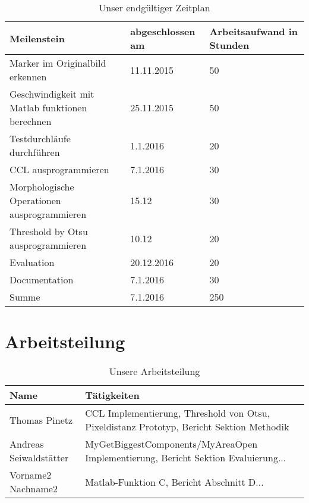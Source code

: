 \documentclass[deutsch]{scrartcl}
\begin{document}
\begin{center}
	\begin{table}
		\begin{tabularx}{\textwidth}{ |X|X|X| }
			\hline
			Meilenstein & abgeschlossen am & Arbeitsaufwand in Stunden\\
			\hline		
			Marker im Originalbild erkennen & 11.11.2015 &	50 \\
			\hline
			Geschwindigkeit mit Matlab funktionen berechnen & 25.11.2015 & 50\\ 
			\hline
			Testdurchläufe durchführen & 1.1.2016 & 20 \\
			\hline
			CCL ausprogrammieren & 7.1.2016 & 30\\
			\hline		
			Morphologische Operationen ausprogrammieren & 15.12 & 30 \\
			\hline
			Threshold by Otsu ausprogrammieren & 10.12 & 20 \\
			\hline
			Evaluation & 20.12.2016 & 20 \\
			\hline
			Documentation & 7.1.2016 & 30 \\
			\hline
			\hline
			Summe & 7.1.2016 & 250 \\
			\hline
		\end{tabularx}	
		\caption{Unser endgültiger Zeitplan}
		\label{table:zeitplan}
	\end{table}
\end{center}


\section{Arbeitsteilung}

\begin{center}
	\begin{table}
	\begin{tabularx} {\textwidth}{ |X | X | }
		\hline
		Name & Tätigkeiten\\
		\hline
		Thomas Pinetz & CCL Implementierung, Threshold von Otsu, \newline Pixeldistanz Prototyp, Bericht Sektion Methodik \\
		\hline
		Andreas Seiwaldstätter & MyGetBiggestComponents/MyAreaOpen Implementierung, \newline Bericht Sektion Evaluierung...\\
		\hline
		\hline
		Vorname2 Nachname2 & Matlab-Funktion C, Bericht Abschnitt D...\\
		\hline
	\end{tabularx}
		\caption{Unsere Arbeitsteilung}
		\label{table:arbeitsteilung}	
	\end{table}
\end{center}
\end{document}
